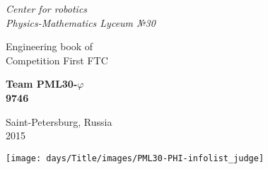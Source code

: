 \thispagestyle{titlestyle}
\begin{titlepage}
	
	\begin{center}
		\LARGE\textit{Center for robotics \\ Physics-Mathematics Lyceum №30}
        \begin{figure}[H]
        \end{figure}
		\vspace{3em}
		
		\LARGE{Engineering book of \\ Competition First FTC}
		
		\vspace{2em}
		
		\bf\fontsize{50}{60}\selectfont Team PML30-${\varphi}$ \\ 9746 \fontsize{11}{13}\selectfont
			
	\vspace{6em}
		
		\begin{figure}[H]
		\end{figure}
			
		\LARGE\normalfont Saint-Petersburg, Russia	\\ 2015
	\end{center}
\end{titlepage}

\newpage

\texttt{[image: days/Title/images/PML30-PHI-infolist\_judge]}
